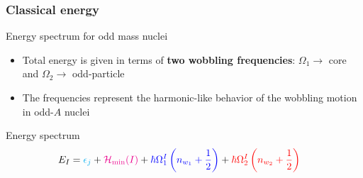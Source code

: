 \documentclass{beamer}
\begin{document}
\begin{frame}
  \frametitle{Classical energy}
\begin{block}{Energy spectrum for odd mass nuclei}
  \begin{itemize}
    \item Total energy is given in terms of \textbf{two wobbling frequencies}: $\Omega_1\to$ {\color{red}core} and $\Omega_2\to$ {\color{blue}odd-particle}
    \item The frequencies represent the harmonic-like behavior of the wobbling motion in odd-$A$ nuclei
  \end{itemize}
\end{block}
  \begin{exampleblock}{Energy spectrum}
    \begin{align}
        E_I&={\color{cyan}\epsilon_{j}}+{\color{magenta}\mathcal{H}_\text{min}(I)}+{\color{blue}\hbar\Omega_1^I\left(n_{w_1}+\frac{1}{2}\right)}+{\color{red}\hbar\Omega_2^I\left(n_{w_2}+\frac{1}{2}\right)}
      \end{align} 
    \end{exampleblock}
\end{frame}
\end{document}

